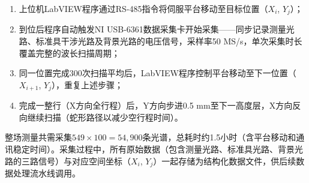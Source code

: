 \begin{enumerate}
	\item 上位机LabVIEW程序通过RS-485指令将伺服平台移动至目标位置（$X_i$, $Y_j$）；
	\item 到位后程序自动触发NI USB-6361数据采集卡开始采集——同步记录测量光路、标准具干涉光路及背景光路的电压信号，采样率50 MS/s，单次采集时长覆盖完整的波长扫描周期；
	\item 同一位置完成300次扫描平均后，LabVIEW程序控制平台移动至下一位置（$X_{i+1}$, $Y_j$），重复上述步骤；
	\item 完成一整行（X方向全行程）后，Y方向步进0.5 mm至下一高度层，X方向反向继续扫描（蛇形路径以减少空行程时间）。
\end{enumerate}

整场测量共需采集$549 \times 100 = 54{,}900$条光谱，总耗时约1.5小时（含平台移动和通讯稳定时间）。采集过程中，所有原始数据（包含测量光路、标准具光路、背景光路的三路信号）与对应空间坐标（$X_i$, $Y_j$）一起存储为结构化数据文件，供后续数据处理流水线调用。